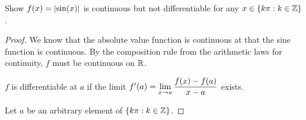 \question Show $f(x) = \abs{\sin(x)}$ is continuous but not differentiable for any $x \in \{k\pi : k \in \mathbb{Z}\}$.
\begin{proof}
  We know that the absolute value function is continuous at that the sine function is continuous.
  By the composition rule from the arithmetic laws for continuity, $f$ must be continuous on $\mathbb{R}$.

  $f$ is differentiable at $a$ if the limit $f'(a)=\displaystyle\lim_{x\to a}\frac{f(x)-f(a)}{x-a}$ exists.

  Let $a$ be an arbitrary element of $\{k\pi : k \in \mathbb{Z}\}$.
\end{proof}

